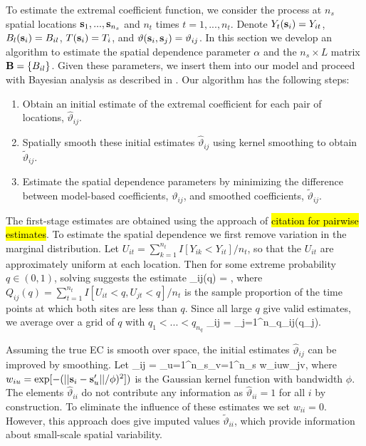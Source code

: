 \documentclass[11pt]{article}
\begin{document}
To estimate the extremal coefficient function, we consider the process at $n_s$ spatial locations $\mbox{\bf s}_1,...,\mbox{\bf s}_{n_s}$ and $n_t$ times $t=1,...,n_t$.
Denote $Y_t(\mbox{\bf s}_i) = Y_{it}$, $B_l(\mbox{\bf s}_i) = B_{il}$, $T(\mbox{\bf s}_i)=T_i$, and $\vartheta(\mbox{\bf s}_i,\mbox{\bf s}_j) = \vartheta_{ij}$.
In this section we develop an algorithm to estimate the spatial dependence parameter $\alpha$ and the $n_s\times L$ matrix $\mbox{\bf B} = \{B_{il}\}$.
Given these parameters, we insert them into our model and proceed with Bayesian analysis as described in .
Our algorithm has the following steps:
\begin{enumerate}[(1)]
  \item Obtain an initial estimate of the extremal coefficient for each pair of locations, ${\hat \vartheta}_{ij}$.
  \item Spatially smooth these initial estimates ${\hat \vartheta}_{ij}$ using kernel smoothing to obtain ${\tilde \vartheta}_{ij}$.
  \item Estimate the spatial dependence parameters by minimizing the difference between model-based coefficients, $\vartheta_{ij}$, and smoothed coefficients, ${\tilde \vartheta}_{ij}$.
\end{enumerate}

The first-stage estimates are obtained using the approach of \hl{citation for pairwise estimates}.
To estimate the spatial dependence we first remove variation in the marginal distribution.
Let $U_{it} = \sum_{k=1}^{n_t} I[Y_{ik}<Y_{it}]/n_t$, so that the $U_{it}$ are approximately uniform at each location.
Then for some extreme probability $q\in(0,1)$, solving  suggests the estimate
\beq\label{ebeq:EChat0}
   {\hat \vartheta}_{ij}(q) = ,
\eeq
where $Q_{ij}(q) = \sum_{t=1}^{n_t}I[U_{it}<q,U_{jt}<q]/n_t$ is the sample proportion of the time points at which both sites are less than $q$.
Since all large $q$ give valid estimates, we average over a grid of $q$ with $q_1<...<q_{n_q}$
\beq\label{ebeq:EChat1}
{\hat \vartheta}_{ij} = \sum_{j=1}^{n_q}{\hat \vartheta}_{ij}(q_j).
\eeq

Assuming the true EC is smooth over space, the initial estimates ${\hat \vartheta}_{ij}$ can be improved by smoothing.
Let
\beq\label{ebeq:EChat2}
  {\tilde \vartheta}_{ij} = 
  {\sum_{u=1}^{n_s}\sum_{v=1}^{n_s} w_{iu}w_{jv}},
\eeq
where $w_{iu} = \exp[-(||\mbox{\bf s}_i-\mbox{\bf s}_u'||/\phi)^2])$ is the Gaussian kernel function with bandwidth $\phi$.
The elements ${\hat \vartheta}_{ii}$ do not contribute any information as ${\hat \vartheta}_{ii}=1$ for all $i$ by construction.
To eliminate the influence of these estimates we set $w_{ii}=0$.
However, this approach does give imputed values ${\tilde \vartheta}_{ii}$, which provide information about small-scale spatial variability.
\end{document}
